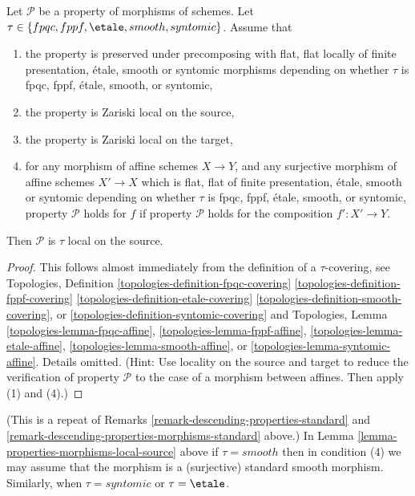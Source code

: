 \begin{lemma}
\label{lemma-properties-morphisms-local-source}
Let $\mathcal{P}$ be a property of morphisms of schemes.
Let $\tau \in \{fpqc, \linebreak[0] fppf, \linebreak[0]
\etale, \linebreak[0] smooth, \linebreak[0] syntomic\}$.
Assume that
\begin{enumerate}
\item the property is preserved under precomposing with
flat, flat locally of finite presentation, \'etale, smooth or syntomic morphisms
depending on whether $\tau$ is fpqc, fppf, \'etale, smooth, or syntomic,
\item the property is Zariski local on the source,
\item the property is Zariski local on the target,
\item for any morphism of affine schemes $X \to Y$, and
any surjective morphism of affine schemes $X' \to X$
which is flat, flat of finite presentation,
\'etale, smooth or syntomic depending on whether $\tau$ is
fpqc, fppf, \'etale, smooth, or syntomic, property
$\mathcal{P}$ holds for $f$ if property $\mathcal{P}$
holds for the composition $f' : X' \to Y$.
\end{enumerate}
Then $\mathcal{P}$ is $\tau$ local on the source.
\end{lemma}

\begin{proof}
This follows almost immediately from the definition of
a $\tau$-covering, see
Topologies, Definition
\ref{topologies-definition-fpqc-covering}
\ref{topologies-definition-fppf-covering}
\ref{topologies-definition-etale-covering}
\ref{topologies-definition-smooth-covering}, or
\ref{topologies-definition-syntomic-covering}
and Topologies, Lemma
\ref{topologies-lemma-fpqc-affine},
\ref{topologies-lemma-fppf-affine},
\ref{topologies-lemma-etale-affine},
\ref{topologies-lemma-smooth-affine}, or
\ref{topologies-lemma-syntomic-affine}.
Details omitted. (Hint: Use locality on the source and target to
reduce the verification of property $\mathcal{P}$ to the case of
a morphism between affines. Then apply (1) and (4).)
\end{proof}

\begin{remark}
\label{remark-properties-morphisms-local-source-standard}
(This is a repeat of
Remarks \ref{remark-descending-properties-standard}
and \ref{remark-descending-properties-morphisms-standard} above.)
In Lemma \ref{lemma-properties-morphisms-local-source} above if
$\tau = smooth$ then in condition (4) we may assume that
the morphism is a (surjective) standard smooth morphism.
Similarly, when $\tau = syntomic$ or $\tau = \etale$.
\end{remark}



